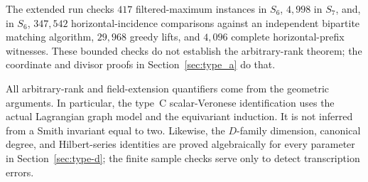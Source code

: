 The extended run checks $417$ filtered-maximum instances in $S_6$, $4{,}998$ in $S_7$, and, in $S_6$, $347{,}542$ horizontal-incidence comparisons against an independent bipartite matching algorithm, $29{,}968$ greedy lifts, and $4{,}096$ complete horizontal-prefix witnesses. These bounded checks do not establish the arbitrary-rank theorem; the coordinate and divisor proofs in Section~\ref{sec:type_a} do that.

All arbitrary-rank and field-extension quantifiers come from the geometric arguments. In particular, the type~C scalar-Veronese identification uses the actual Lagrangian graph model and the equivariant induction. It is not inferred from a Smith invariant equal to two. Likewise, the $D$-family dimension, canonical degree, and Hilbert-series identities are proved algebraically for every parameter in Section~\ref{sec:type-d}; the finite sample checks serve only to detect transcription errors.
